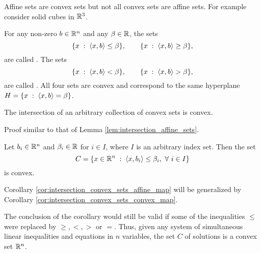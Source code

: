 \documentclass[11pt,a4paper]{article}
\begin{document}
\begin{remark}
    Affine sets are convex sets but not all convex sets are affine sets. For example consider solid cubes in $\mathbb{R}^3$. 
\end{remark}

\begin{example}
    For any non-zero $b\in\mathbb{R}^n$ and any $\beta\in\mathbb{R}$, the sets 
    \begin{equation*}
        \{x\;:\; \langle x, b \rangle\le \beta\}, \qquad \{x\;:\; \langle x, b \rangle\ge \beta\},
    \end{equation*} 
    are called . The sets
    \begin{equation*}
        \{x\;:\; \langle x, b \rangle< \beta\}, \qquad \{x\;:\; \langle x, b \rangle> \beta\},
    \end{equation*}
    are called . All four sets are convex and correspond to the same hyperplane $H = \{x\;:\; \langle x, b \rangle = \beta\}$.
\end{example}

\begin{lemma}\label{lem:intersection_convex_sets}
    The intersection of an arbitrary collection of convex sets is convex.
\end{lemma}

Proof similar to that of Lemma \ref{lem:intersection_affine_sets}.

\begin{corollary}\label{cor:intersection_convex_sets_affine_map}
    Let $b_i\in\mathbb{R}^n$ and $\beta_i\in\mathbb{R}$ for $i\in I$, where $I$ is an arbitrary index set. Then the set 
    \begin{equation*}
        C = \{x\in\mathbb{R}^n\;:\; \langle x, b_i \rangle\le \beta_i,\ \forall\ i\in I\}
    \end{equation*}
    is convex.
\end{corollary}

Corollary \ref{cor:intersection_convex_sets_affine_map} will be generalized by Corollary \ref{cor:intersection_convex_sets_convex_map}.

\begin{remark}\label{rem:all_sym}
    The conclusion of the corollary would still be valid if some of the inequalities $\le$ were replaced by $\ge,<,>$ or $=$. Thus, given any system of simultaneous linear inequalities and equations in $n$ variables, the set $C$ of solutions is a convex set $\mathbb{R}^n$.
\end{remark}
\end{document}
